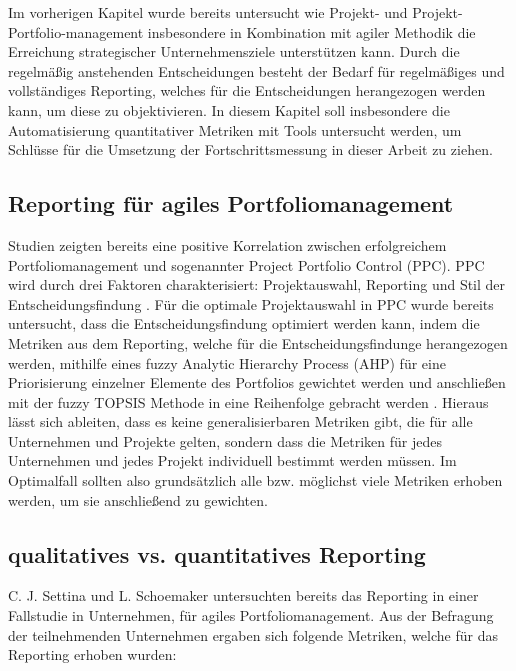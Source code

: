 Im vorherigen Kapitel wurde bereits untersucht wie Projekt- und Projekt-Portfolio-management insbesondere in Kombination mit agiler Methodik die Erreichung strategischer Unternehmensziele unterstützen kann. Durch die regelmäßig anstehenden Entscheidungen besteht der Bedarf für regelmäßiges und vollständiges Reporting, welches für die Entscheidungen herangezogen werden kann, um diese zu objektivieren. In diesem Kapitel soll insbesondere die Automatisierung quantitativer Metriken mit Tools untersucht werden, um Schlüsse für die Umsetzung der Fortschrittsmessung in dieser Arbeit zu ziehen.

\subsection{Reporting für agiles Portfoliomanagement}
Studien zeigten bereits eine positive Korrelation zwischen erfolgreichem Portfoliomanagement und sogenannter Project Portfolio Control (PPC). PPC wird durch drei Faktoren charakterisiert: Projektauswahl, Reporting und Stil der Entscheidungsfindung \cite{ProjectPortfolioControl}.
Für die optimale Projektauswahl in PPC wurde bereits untersucht, dass die Entscheidungsfindung optimiert werden kann, indem die Metriken aus dem Reporting, welche für die Entscheidungsfindunge herangezogen werden, mithilfe eines fuzzy Analytic Hierarchy Process (AHP) für eine Priorisierung einzelner Elemente des Portfolios gewichtet werden und anschließen mit der fuzzy TOPSIS Methode in eine Reihenfolge gebracht werden \cite{Mohammed2021}.
Hieraus lässt sich ableiten, dass es keine generalisierbaren Metriken gibt, die für alle Unternehmen und Projekte gelten, sondern dass die Metriken für jedes Unternehmen und jedes Projekt individuell bestimmt werden müssen. Im Optimalfall sollten also grundsätzlich alle bzw. möglichst viele  Metriken erhoben werden, um sie anschließend zu gewichten.

\subsection{qualitatives vs. quantitatives Reporting}
C. J. Settina und L. Schoemaker \cite{reportingInAgilePortfoliomanagement} untersuchten bereits das Reporting in einer Fallstudie in Unternehmen, für agiles Portfoliomanagement. Aus der Befragung der teilnehmenden Unternehmen ergaben sich folgende Metriken, welche für das Reporting erhoben wurden:

